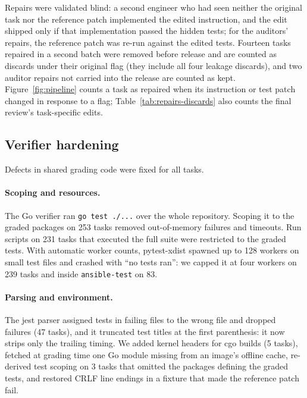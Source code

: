 Repairs were validated blind: a second engineer who had seen neither the original task nor the reference patch implemented the edited instruction, and the edit shipped only if that implementation passed the hidden tests; for the auditors' repairs, the reference patch was re-run against the edited tests. Fourteen tasks repaired in a second batch were removed before release and are counted as discards under their original flag (they include all four leakage discards), and two auditor repairs not carried into the release are counted as kept. Figure~\ref{fig:pipeline} counts a task as repaired when its instruction or test patch changed in response to a flag; Table~\ref{tab:repairs-discards} also counts the final review's task-specific edits.


\subsection{Verifier hardening}
\label{sec:verifier}

Defects in shared grading code were fixed for all tasks.

\paragraph{Scoping and resources.}
The Go verifier ran \texttt{go test ./...} over the whole repository. Scoping it to the graded packages on 253 tasks removed out-of-memory failures and timeouts. Run scripts on 231 tasks that executed the full suite were restricted to the graded tests. With automatic worker counts, pytest-xdist spawned up to 128 workers on small test files and crashed with ``no tests ran'': we capped it at four workers on 239 tasks and inside \texttt{ansible-test} on 83.

\paragraph{Parsing and environment.}
The jest parser assigned tests in failing files to the wrong file and dropped failures (47 tasks), and it truncated test titles at the first parenthesis: it now strips only the trailing timing. We added kernel headers for cgo builds (5 tasks), fetched at grading time one Go module missing from an image's offline cache, re-derived test scoping on 3 tasks that omitted the packages defining the graded tests, and restored CRLF line endings in a fixture that made the reference patch fail.

